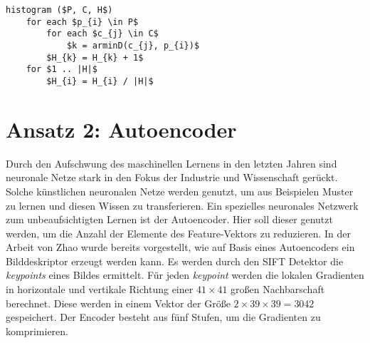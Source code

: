 
\begin{lstlisting}[mathescape=true]
histogram ($P, C, H$)
	for each $p_{i} \in P$
		for each $c_{j} \in C$
			$k = arminD(c_{j}, p_{i})$ 
		$H_{k} = H_{k} + 1$		
	for $1 .. |H|$
		$H_{i} = H_{i} / |H|$
\end{lstlisting}

\section{Ansatz 2: Autoencoder}

Durch den Aufschwung des maschinellen Lernens in den letzten Jahren sind neuronale Netze stark in den Fokus der Industrie und Wissenschaft gerückt. Solche künstlichen neuronalen Netze werden genutzt, um aus Beispielen Muster zu lernen und diesen Wissen zu transferieren. 
Ein spezielles neuronales Netzwerk zum unbeaufsichtigten Lernen ist der Autoencoder. Hier soll dieser genutzt werden, um die Anzahl der Elemente des Feature-Vektors zu reduzieren. In der Arbeit von Zhao \cite{aed2016} wurde bereits vorgestellt, wie auf Basis eines Autoencoders ein Bilddeskriptor erzeugt werden kann. Es werden durch den SIFT Detektor die \textit{keypoints} eines Bildes ermittelt. Für jeden \textit{keypoint} werden die lokalen Gradienten in horizontale und vertikale Richtung einer $41 \times 41$ großen Nachbarschaft berechnet. Diese werden in einem Vektor der Größe $2 \times 39 \times 39 = 3042$ gespeichert. Der Encoder besteht aus fünf Stufen, um die Gradienten zu komprimieren.

\todo{}
